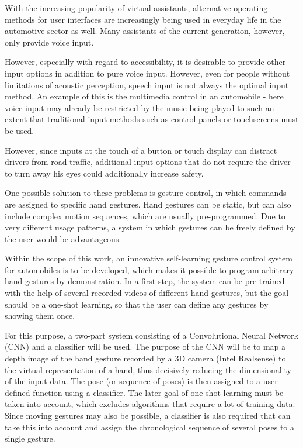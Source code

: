 With the increasing popularity of virtual assistants, alternative operating methods for user interfaces are increasingly being used in everyday life in the automotive sector as well. Many assistants of the current generation, however, only provide voice input.

However, especially with regard to accessibility, it is desirable to provide other input options in addition to pure voice input. However, even for people without limitations of acoustic perception, speech input is not always the optimal input method. An example of this is the multimedia control in an automobile - here voice input may already be restricted by the music being played to such an extent that traditional input methods such as control panels or touchscreens must be used. 

However, since inputs at the touch of a button or touch display can distract drivers from road traffic, additional input options that do not require the driver to turn away his eyes could additionally increase safety.

One possible solution to these problems is gesture control, in which commands are assigned to specific hand gestures. Hand gestures can be static, but can also include complex motion sequences, which are usually pre-programmed. Due to very different usage patterns, a system in which gestures can be freely defined by the user would be advantageous. 

Within the scope of this work, an innovative self-learning gesture control system for automobiles is to be developed, which makes it possible to program arbitrary hand gestures by demonstration. In a first step, the system can be pre-trained with the help of several recorded videos of different hand gestures, but the goal should be a one-shot learning, so that the user can define any gestures by showing them once.

For this purpose, a two-part system consisting of a Convolutional Neural Network (CNN) and a classifier will be used. The purpose of the CNN will be to map a depth image of the hand gesture recorded by a 3D camera (Intel Realsense) to the virtual representation of a hand, thus decisively reducing the dimensionality of the input data. The pose (or sequence of poses) is then assigned to a user-defined function using a classifier. The later goal of one-shot learning must be taken into account, which excludes algorithms that require a lot of training data. Since moving gestures may also be possible, a classifier is also required that can take this into account and assign the chronological sequence of several poses to a single gesture.

